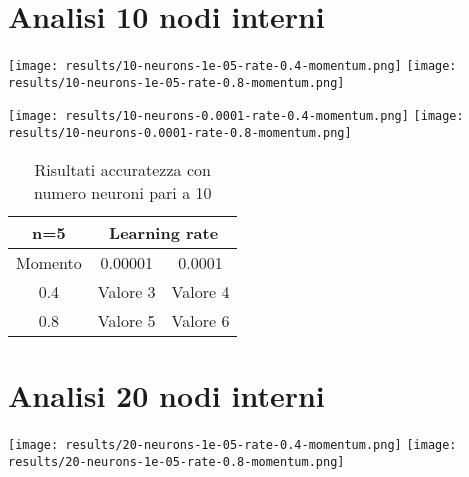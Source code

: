 \section{Analisi 10 nodi interni}
\begin{center}
\texttt{[image: results/10-neurons-1e-05-rate-0.4-momentum.png]}
\texttt{[image: results/10-neurons-1e-05-rate-0.8-momentum.png]}
\end{center}

\begin{center}
\texttt{[image: results/10-neurons-0.0001-rate-0.4-momentum.png]}
\texttt{[image: results/10-neurons-0.0001-rate-0.8-momentum.png]}
\end{center}
\begin{table}[htbp]
    \centering
    \begin{tabular}{|c|c|c|}
    \hline
    n=5 & \multicolumn{2}{c|}{Learning rate} \\
    \hline
    Momento & 0.00001 & 0.0001 \\
    \hline
    0.4 & Valore 3 & Valore 4 \\
    \hline
    0.8 & Valore 5 & Valore 6 \\
    \hline
    \end{tabular}
    \caption{Risultati accuratezza con numero neuroni pari a 10}
\end{table}

\section{Analisi 20 nodi interni}
\begin{center}
\texttt{[image: results/20-neurons-1e-05-rate-0.4-momentum.png]}
\texttt{[image: results/20-neurons-1e-05-rate-0.8-momentum.png]}
\end{center}


